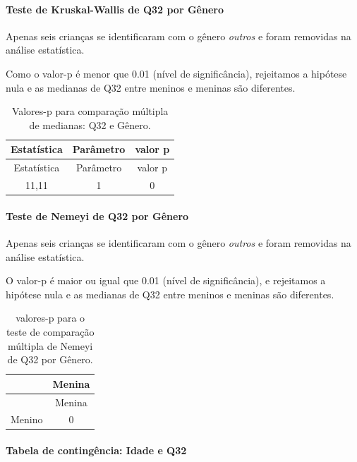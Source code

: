 \documentclass[]{article}
\let\oldparagraph\paragraph
\renewcommand{\paragraph}[1]{\oldparagraph{#1}\mbox{}}
\begin{document}
\hypertarget{teste-de-kruskal-wallis-de-q32-por-guxeanero}{%
\paragraph{Teste de Kruskal-Wallis de Q32 por Gênero}\label{teste-de-kruskal-wallis-de-q32-por-guxeanero}}

Apenas seis crianças se identificaram com o gênero \emph{outros} e foram removidas na análise estatística.

Como o valor-p é menor que 0.01 (nível de significância), rejeitamos a hipótese nula e as medianas de Q32 entre meninos e meninas são diferentes.

\begin{longtable}[]{@{}ccc@{}}
\caption{\label{tab:unnamed-chunk-1091}Valores-p para comparação múltipla de medianas: Q32 e Gênero.}\tabularnewline
\toprule
Estatística & Parâmetro & valor p\tabularnewline
\midrule
\endfirsthead
\toprule
Estatística & Parâmetro & valor p\tabularnewline
\midrule
\endhead
11,11 & 1 & 0\tabularnewline
\bottomrule
\end{longtable}

\hypertarget{teste-de-nemeyi-de-q32-por-guxeanero}{%
\paragraph{Teste de Nemeyi de Q32 por Gênero}\label{teste-de-nemeyi-de-q32-por-guxeanero}}

Apenas seis crianças se identificaram com o gênero \emph{outros} e foram removidas na análise estatística.

O valor-p é maior ou igual que 0.01 (nível de significância), e rejeitamos a hipótese nula e as medianas de Q32 entre meninos e meninas são diferentes.

\begin{longtable}[]{@{}lc@{}}
\caption{\label{tab:unnamed-chunk-1093}valores-p para o teste de comparação múltipla de Nemeyi de Q32 por Gênero.}\tabularnewline
\toprule
& Menina\tabularnewline
\midrule
\endfirsthead
\toprule
& Menina\tabularnewline
\midrule
\endhead
Menino & 0\tabularnewline
\bottomrule
\end{longtable}

\cleardoublepage

\hypertarget{tabela-de-continguxeancia-idade-e-q32}{%
\paragraph{Tabela de contingência: Idade e Q32}\label{tabela-de-continguxeancia-idade-e-q32}}
\end{document}
